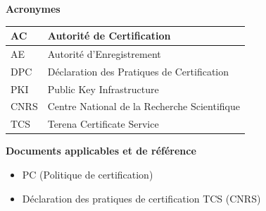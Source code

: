 \documentclass[a4paper,11pt,french]{article}
\begin{document}
\newpage
\textbf {Acronymes}


\begin{tabular}{|l|p{10cm}|}

\hline
AC & Autorité de Certification
\\
\hline
AE  & Autorité d'Enregistrement 
\\

\hline
DPC & Déclaration des Pratiques de Certification
\\
\hline
PKI & Public Key Infrastructure
\\
\hline
CNRS & Centre National de la Recherche Scientifique
\\
\hline
TCS & Terena Certificate Service
\\
\hline
\end{tabular}



\newpage
\textbf {Documents applicables et de référence}
\begin{itemize}
\item PC (Politique de certification)
\item Déclaration des pratiques de certification TCS (CNRS)

\end{itemize}
\end{document}
